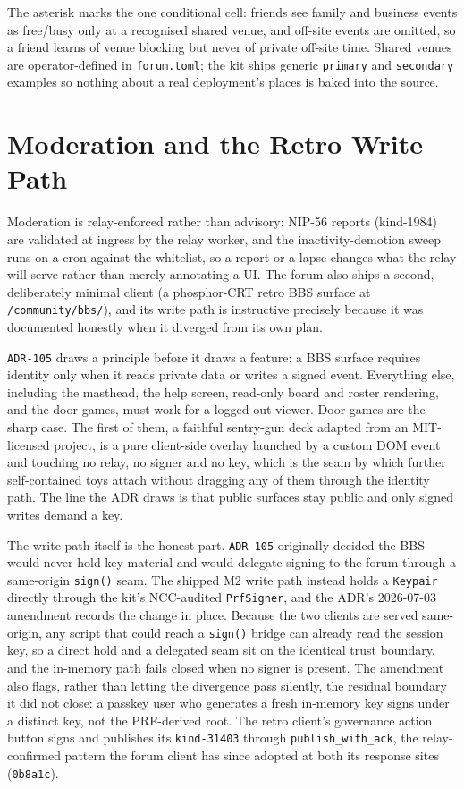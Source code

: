 The asterisk marks the one conditional cell: friends see family and business events as free/busy only at a recognised shared venue, and off-site events are omitted, so a friend learns of venue blocking but never of private off-site time. Shared venues are operator-defined in \texttt{forum.toml}; the kit ships generic \texttt{primary} and \texttt{secondary} examples so nothing about a real deployment's places is baked into the source.

\section{Moderation and the Retro Write Path}

Moderation is relay-enforced rather than advisory: NIP-56 reports (kind-1984) are validated at ingress by the relay worker, and the inactivity-demotion sweep runs on a cron against the whitelist, so a report or a lapse changes what the relay will serve rather than merely annotating a UI. The forum also ships a second, deliberately minimal client (a phosphor-CRT retro BBS surface at \texttt{/community/bbs/}), and its write path is instructive precisely because it was documented honestly when it diverged from its own plan.

\texttt{ADR-105} draws a principle before it draws a feature: a BBS surface requires identity only when it reads private data or writes a signed event. Everything else, including the masthead, the help screen, read-only board and roster rendering, and the door games, must work for a logged-out viewer. Door games are the sharp case. The first of them, a faithful sentry-gun deck adapted from an MIT-licensed project, is a pure client-side overlay launched by a custom DOM event and touching no relay, no signer and no key, which is the seam by which further self-contained toys attach without dragging any of them through the identity path. The line the ADR draws is that public surfaces stay public and only signed writes demand a key.

The write path itself is the honest part. \texttt{ADR-105} originally decided the BBS would never hold key material and would delegate signing to the forum through a same-origin \texttt{sign()} seam. The shipped M2 write path instead holds a \texttt{Keypair} directly through the kit's NCC-audited \texttt{PrfSigner}, and the ADR's 2026-07-03 amendment records the change in place. Because the two clients are served same-origin, any script that could reach a \texttt{sign()} bridge can already read the session key, so a direct hold and a delegated seam sit on the identical trust boundary, and the in-memory path fails closed when no signer is present. The amendment also flags, rather than letting the divergence pass silently, the residual boundary it did not close: a passkey user who generates a fresh in-memory key signs under a distinct key, not the PRF-derived root. The retro client's governance action button signs and publishes its \texttt{kind-31403} through \texttt{publish\_with\_ack}, the relay-confirmed pattern the forum client has since adopted at both its response sites (\texttt{0b8a1c}).

